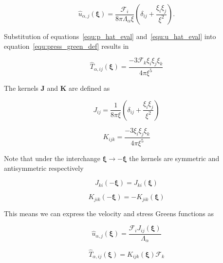\documentclass[12pt]{article}
\begin{document}
\begin{equation}
\label{equ:u_hat_eval}
\hat{u}_{\alpha,j}(\boldsymbol\xi) = \frac{\mathcal{F}_{i}}{8 \pi \Lambda_{\alpha} \xi} \left(\delta_{ij} + \frac{\xi_{i} \xi_{j}}{\xi^{2}} \right).
\end{equation}


Substitution of equations~\ref{equ:p_hat_eval} and~\ref{equ:u_hat_eval} into equation~\ref{equ:press_green_def} results in

\begin{equation}
\label{equ:green_stress}
\hat{T}_{\alpha, ij} (\boldsymbol\xi) = \frac{-3 \mathcal{F}_{k} \xi_{i} \xi_{j} \xi_{k}}{4 \pi \xi^{5}}
\end{equation}


The kernels $\boldsymbol{J}$ and $\boldsymbol{K}$ are defined as

\begin{equation}
\label{equ:j_kernel}
J_{ij} = \frac{1}{8 \pi \xi} \left(\delta_{ij} + \frac{\xi_{i} \xi_{j}}{\xi^{2}} \right)
\end{equation}

\begin{equation}
\label{equ:k_kernel}
K_{ijk} = \frac{-3 \xi_{i} \xi_{j} \xi_{k}}{4 \pi \xi^{5}}
\end{equation}

Note that under the interchange $\boldsymbol\xi \to -\boldsymbol\xi$ the kernels are symmetric and antisymmetric respectively

\begin{equation}
\label{equ:j_sym}
J_{ki}(-\boldsymbol\xi) = J_{ki}(\boldsymbol\xi)
\end{equation}

\begin{equation}
\label{equ:k_sym}
K_{jik}(-\boldsymbol\xi) = -K_{jik}(\boldsymbol\xi)
\end{equation}

This means we can express the velocity and stress Greens functions as

\begin{equation}
\label{equ:u_green}
\hat{u}_{\alpha,j}(\boldsymbol\xi) = \frac{\mathcal{F}_{i} J_{ij} (\boldsymbol\xi)}{\Lambda_{\alpha}}
\end{equation}

\begin{equation}
\label{equ:stress_green}
\hat{T}_{\alpha, ij}(\boldsymbol\xi) = K_{ijk} (\boldsymbol\xi) \mathcal{F}_{k}
\end{equation}
\end{document}
